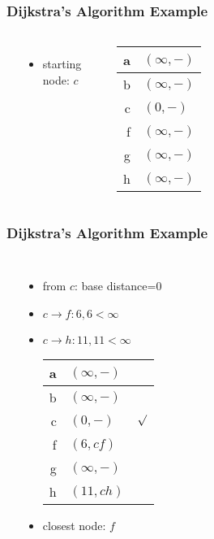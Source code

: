 \documentclass[dvipsnames]{beamer}
\begin{document}
\begin{frame}
  \frametitle{Dijkstra's Algorithm Example}

  \begin{columns}
    \begin{center}
    \end{center}

    \begin{itemize}
      \item starting node: $c$
    \end{itemize}

    \begin{table}
      \begin{tabular}{r|l}
        a & $(\infty,-)$ \\\hline
        b & $(\infty,-)$ \\\hline
        c & $(0,-)$      \\\hline
        f & $(\infty,-)$ \\\hline
        g & $(\infty,-)$ \\\hline
        h & $(\infty,-)$
      \end{tabular}
    \end{table}
  \end{columns}
\end{frame}

\begin{frame}
  \frametitle{Dijkstra's Algorithm Example}

  \begin{columns}
    \begin{center}
    \end{center}

    \begin{itemize}
      \item from $c$: base distance=$0$
      \item $c \rightarrow f: 6, 6 < \infty$
      \item $c \rightarrow h: 11, 11 < \infty$

      \pause
      \begin{table}
        \begin{tabular}{r|l|c}
          a & $(\infty,-)$ & \\\hline
          b & $(\infty,-)$ & \\\hline
          c & $(0,-)$      & $\surd$ \\\hline
          f & $(6,cf)$     & \\\hline
          g & $(\infty,-)$ & \\\hline
          h & $(11,ch)$    &
        \end{tabular}
      \end{table}

      \pause
      \item closest node: $f$
    \end{itemize}
  \end{columns}
\end{frame}
\end{document}
